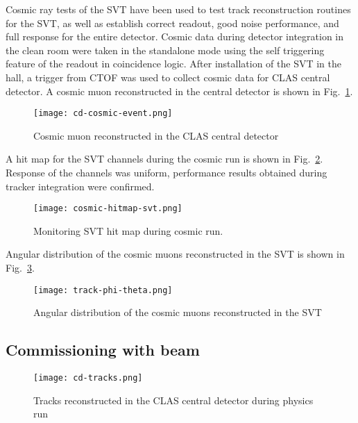 Cosmic ray tests of the SVT have been used to test track reconstruction routines for the SVT, as well as establish correct readout, good noise performance, and full response for the entire detector. Cosmic data during detector integration in the clean room were taken in the standalone mode using the self triggering feature of the readout in coincidence logic. After installation of the SVT in the hall, a trigger from CTOF was used to collect cosmic data for CLAS central detector. A cosmic muon reconstructed in the central detector is shown in Fig.~\ref{fig:cd-cosmic-event}.

\begin{figure}[hbt] 
\centering 
\texttt{[image: cd-cosmic-event.png]}
\caption{Cosmic muon reconstructed in the CLAS central detector}
\label{fig:cd-cosmic-event}
\end{figure}

A hit map for the SVT channels during the cosmic run is shown in Fig.~\ref{fig:cosmic-hitmap-svt}. Response of the channels was uniform, performance results obtained during tracker integration were confirmed.

\begin{figure}[hbt] 
\centering 
\texttt{[image: cosmic-hitmap-svt.png]}
\caption{Monitoring SVT hit map during cosmic run.}
\label{fig:cosmic-hitmap-svt}
\end{figure}

Angular distribution of the cosmic muons reconstructed in the SVT is shown in Fig.~\ref{fig:track-phi-theta}.

\begin{figure}[hbt] 
\centering 
\texttt{[image: track-phi-theta.png]}
\caption{Angular distribution of the cosmic muons reconstructed in the SVT}
\label{fig:track-phi-theta}
\end{figure}

\subsection{Commissioning with beam}

\begin{figure}[hbt] 
\centering 
\texttt{[image: cd-tracks.png]}
\caption{Tracks reconstructed in the CLAS central detector during physics run}
\label{fig:cd-tracks}
\end{figure}

